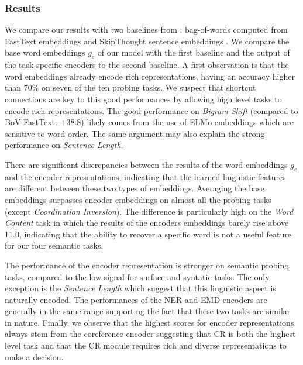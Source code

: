\documentclass[letterpaper]{article} %
\begin{document}
\subsubsection*{Results}

We compare our results with two baselines from \cite{Conneau2018}: bag-of-words computed from FastText embeddings and SkipThought sentence embeddings \cite{kiros2015skip}. We compare the base word embeddings $g_{e}$ of our model with the first baseline and the output of the task-specific encoders to the second baseline. A first observation is that the word embeddings already encode rich representations, having an accuracy higher than 70\% on seven of the ten probing tasks. We suspect that shortcut connections are key to this good performances by allowing high level tasks to encode rich representations. The good performance on \textit{Bigram Shift} (compared to BoV-FastText: +38.8) likely comes from the use of ELMo embeddings which are sensitive to word order. The same argument may also explain the strong performance on \textit{Sentence Length}.

There are significant discrepancies between the results of the word embeddings $g_{e}$ and the encoder representations, indicating that the learned linguistic features are different between these two types of embeddings. Averaging the base embeddings surpasses encoder embeddings on almost all the probing tasks (except \textit{Coordination Inversion}). The difference is particularly high on the \textit{Word Content} task in which the results of the encoders embeddings barely rise above 11.0, indicating that the ability to recover a specific word is not a useful feature for our four semantic tasks.

The performance of the encoder representation is stronger on semantic probing tasks, compared to the low signal for surface and syntatic tasks. The only exception is the \textit{Sentence Length} which suggest that this linguistic aspect is naturally encoded. The performances of the NER and EMD encoders are generally in the same range supporting the fact that these two tasks are similar in nature. Finally, we observe that the highest scores for encoder representations always stem from the coreference encoder suggesting that CR is both the highest level task and that the CR module requires rich and diverse representations to make a decision.
\end{document}
